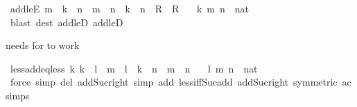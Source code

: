 \begin{isabellebody}
\endisatagproof
{\isafoldproof}%
%
\isadelimproof
\isanewline
%
\endisadelimproof
\isanewline
{}\isamarkupfalse%
\ add{\isacharunderscore}{\kern0pt}leE{\isacharcolon}{\kern0pt}\ {\isachardoublequoteopen}m\ {\isacharplus}{\kern0pt}\ k\ {\isasymle}\ n\ {\isasymLongrightarrow}\ {\isacharparenleft}{\kern0pt}m\ {\isasymle}\ n\ {\isasymLongrightarrow}\ k\ {\isasymle}\ n\ {\isasymLongrightarrow}\ R{\isacharparenright}{\kern0pt}\ {\isasymLongrightarrow}\ R{\isachardoublequoteclose}\isanewline
\ \ \ k\ m\ n\ {\isacharcolon}{\kern0pt}{\isacharcolon}{\kern0pt}\ nat\isanewline
%
\isadelimproof
\ \ %
\endisadelimproof
%
\isatagproof
{}\isamarkupfalse%
\ {\isacharparenleft}{\kern0pt}blast\ dest{\isacharcolon}{\kern0pt}\ add{\isacharunderscore}{\kern0pt}leD{}\ add{\isacharunderscore}{\kern0pt}leD{}{\isacharparenright}{\kern0pt}%
\endisatagproof
{\isafoldproof}%
%
\isadelimproof
%
\endisadelimproof
%
\begin{isamarkuptext}%
needs  for  to work%
\end{isamarkuptext}\isamarkuptrue%
\isamarkupfalse%
\ less{\isacharunderscore}{\kern0pt}add{\isacharunderscore}{\kern0pt}eq{\isacharunderscore}{\kern0pt}less{\isacharcolon}{\kern0pt}\ {\isachardoublequoteopen}{\isasymAnd}k{\isachardot}{\kern0pt}\ k\ {\isacharless}{\kern0pt}\ l\ {\isasymLongrightarrow}\ m\ {\isacharplus}{\kern0pt}\ l\ {\isacharequal}{\kern0pt}\ k\ {\isacharplus}{\kern0pt}\ n\ {\isasymLongrightarrow}\ m\ {\isacharless}{\kern0pt}\ n{\isachardoublequoteclose}\isanewline
\ \ \ l\ m\ n\ {\isacharcolon}{\kern0pt}{\isacharcolon}{\kern0pt}\ nat\isanewline
%
\isadelimproof
\ \ %
\endisadelimproof
%
\isatagproof
{}\isamarkupfalse%
\ {\isacharparenleft}{\kern0pt}force\ simp\ del{\isacharcolon}{\kern0pt}\ add{\isacharunderscore}{\kern0pt}Suc{\isacharunderscore}{\kern0pt}right\ simp\ add{\isacharcolon}{\kern0pt}\ less{\isacharunderscore}{\kern0pt}iff{\isacharunderscore}{\kern0pt}Suc{\isacharunderscore}{\kern0pt}add\ add{\isacharunderscore}{\kern0pt}Suc{\isacharunderscore}{\kern0pt}right\ {\isacharbrackleft}{\kern0pt}symmetric{\isacharbrackright}{\kern0pt}\ ac{\isacharunderscore}{\kern0pt}simps{\isacharparenright}{\kern0pt}%
\endisatagproof
{\isafoldproof}%
%
\isadelimproof
%
\endisadelimproof
%
\isadelimdocument
%
\endisadelimdocument
%
\isatagdocument
%
\isamarkuptrue%
%
\endisatagdocument
{\isafolddocument}%
%
\isadelimdocument

\end{isabellebody}
